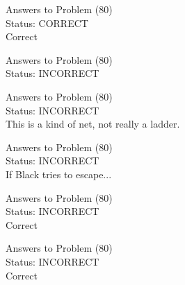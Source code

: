\documentclass[11pt]{article}
\begin{document}
\begin{minipage}[t]{0.5\textwidth}
  {\centering
  
  Answers to Problem (80)\\
  Status: CORRECT\\
  Correct\\
  }
\end{minipage}
\begin{minipage}[t]{0.5\textwidth}
  {\centering
  
  Answers to Problem (80)\\
  Status: INCORRECT\\
  
  }
\end{minipage}
\begin{minipage}[t]{0.5\textwidth}
  {\centering
  
  Answers to Problem (80)\\
  Status: INCORRECT\\
  This is a kind of net, not really a ladder.\\
  }
\end{minipage}
\begin{minipage}[t]{0.5\textwidth}
  {\centering
  
  Answers to Problem (80)\\
  Status: INCORRECT\\
  If Black tries to escape...\\
  }
\end{minipage}
\begin{minipage}[t]{0.5\textwidth}
  {\centering
  
  Answers to Problem (80)\\
  Status: INCORRECT\\
  Correct\\
  }
\end{minipage}
\begin{minipage}[t]{0.5\textwidth}
  {\centering
  
  Answers to Problem (80)\\
  Status: INCORRECT\\
  Correct\\
  }
\end{minipage}
\end{document}
